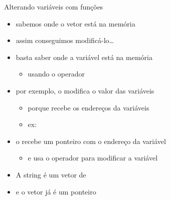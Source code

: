 \documentclass{beamer}
\begin{document}
\begin{frame}[<+->]{Alterando variáveis com funções}
  \begin{itemize}
    \item sabemos onde o vetor está na memória
    \item assim conseguimos modificá-lo\dots
  \end{itemize}

  \bigskip

  \begin{itemize}
    \item basta saber onde a variável está na memória
      \begin{itemize}
        \item usando o operador \coda{\&}
      \end{itemize}
    \item por exemplo, o  modifica o valor das variáveis
      \begin{itemize}
        \item porque recebe os endereços da variáveis
        \item ex: 
      \end{itemize}
    \item o  recebe um ponteiro com o endereço da variável
      \begin{itemize}
        \item e usa o operador \coda{*} para modificar a variável
      \end{itemize}
  \end{itemize}

  \bigskip
  \begin{itemize}
    \item A string é um vetor de 
    \item e o vetor já é um ponteiro
  \end{itemize}
\end{frame}
\end{document}
